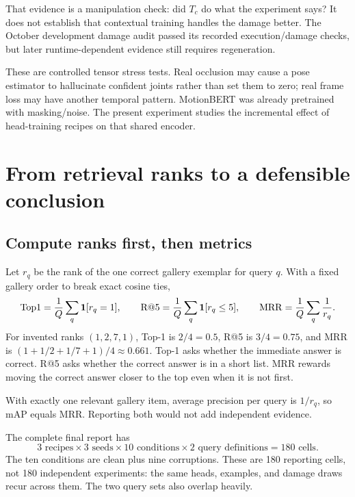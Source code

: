 That evidence is a manipulation check: did $T_c$ do what the experiment says?
It does not establish that contextual training handles the damage better.
The October development damage audit passed its recorded execution/damage
checks, but later runtime-dependent evidence still requires regeneration.

These are controlled tensor stress tests. Real occlusion may cause a pose
estimator to hallucinate confident joints rather than set them to zero; real
frame loss may have another temporal pattern. MotionBERT was already pretrained
with masking/noise. The present experiment studies the incremental effect of
head-training recipes on that shared encoder.


\section{From retrieval ranks to a defensible conclusion}\label{sec:analysis}
\subsection{Compute ranks first, then metrics}
Let $r_q$ be the rank of the one correct gallery exemplar for query $q$.
With a fixed gallery order to break exact cosine ties,
\[
 \mathrm{Top1}=\frac1Q\sum_q\mathbf{1}[r_q=1],\qquad
 \mathrm{R@5}=\frac1Q\sum_q\mathbf{1}[r_q\le5],\qquad
 \mathrm{MRR}=\frac1Q\sum_q\frac1{r_q}.
\]
For invented ranks $(1,2,7,1)$, Top-1 is $2/4=0.5$, R@5 is $3/4=0.75$, and
MRR is $(1+1/2+1/7+1)/4\approx0.661$. Top-1 asks whether the immediate answer
is correct. R@5 asks whether the correct answer is in a short list. MRR rewards
moving the correct answer closer to the top even when it is not first.

With exactly one relevant gallery item, average precision per query is $1/r_q$,
so mAP equals MRR. Reporting both would not add independent evidence.

The complete final report has
\[
 3\text{ recipes}\times3\text{ seeds}\times10\text{ conditions}
 \times2\text{ query definitions}=180\text{ cells}.
\]
The ten conditions are clean plus nine corruptions. These are 180 reporting
cells, not 180 independent experiments: the same heads, examples, and damage
draws recur across them. The two query sets also overlap heavily.

